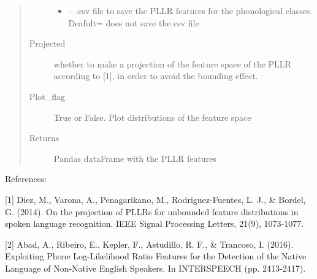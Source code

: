 \documentclass[letterpaper,10pt,english]{sphinxmanual}
\begin{document}
\begin{fulllineitems}
\begin{fulllineitems}
\begin{quote}
\begin{description}
\begin{itemize}
\item {} 
 -- .csv file  to save the PLLR features for the phonological classes. Deafult=\sphinxquotedblright{}\sphinxquotedblright{} does not save the csv file

\end{itemize}

\item[{Projected}] \leavevmode
whether to make a projection of the feature space of the PLLR according to {[}1{]}, in order to avoid the bounding effect.

\item[{Plot\_flag}] \leavevmode
True or False. Plot distributions of the feature space

\item[{Returns}] \leavevmode
Pandas dataFrame with the PLLR features

\end{description}\end{quote}

\begin{sphinxVerbatim}[commandchars=\\\{\}]
   
\PYG{p}{[}\PYG{p}{]}
\end{sphinxVerbatim}

References:

{[}1{]} Diez, M., Varona, A., Penagarikano, M., Rodriguez-Fuentes, L. J., \& Bordel, G. (2014). On the projection of PLLRs for unbounded feature distributions in spoken language recognition. IEEE Signal Processing Letters, 21(9), 1073-1077.

{[}2{]} Abad, A., Ribeiro, E., Kepler, F., Astudillo, R. F., \& Trancoso, I. (2016). Exploiting Phone Log-Likelihood Ratio Features for the Detection of the Native Language of Non-Native English Speakers. In INTERSPEECH (pp. 2413-2417).

\end{fulllineitems}


\end{fulllineitems}
\end{document}

